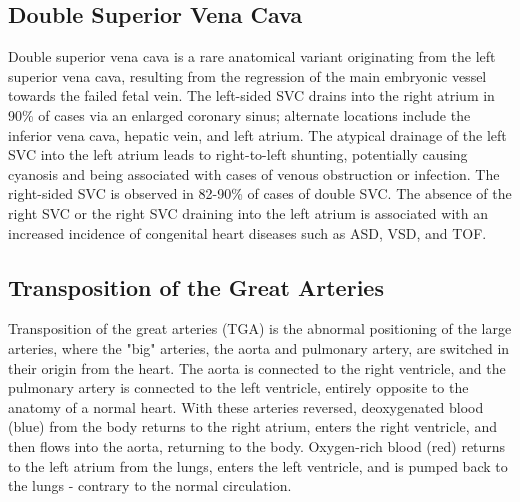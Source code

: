 \documentclass{article}
\begin{document}
\subsection{Double Superior Vena Cava}
Double superior vena cava is a rare anatomical variant originating from the left superior vena cava, resulting from the regression of the main embryonic vessel towards the failed fetal vein. The left-sided SVC drains into the right atrium in 90\% of cases via an enlarged coronary sinus; alternate locations include the inferior vena cava, hepatic vein, and left atrium. The atypical drainage of the left SVC into the left atrium leads to right-to-left shunting, potentially causing cyanosis and being associated with cases of venous obstruction or infection. The right-sided SVC is observed in 82-90\% of cases of double SVC. The absence of the right SVC or the right SVC draining into the left atrium is associated with an increased incidence of congenital heart diseases such as ASD, VSD, and TOF.

\subsection{Transposition of the Great Arteries}
Transposition of the great arteries (TGA) is the abnormal positioning of the large arteries, where the "big" arteries, the aorta and pulmonary artery, are switched in their origin from the heart. The aorta is connected to the right ventricle, and the pulmonary artery is connected to the left ventricle, entirely opposite to the anatomy of a normal heart. With these arteries reversed, deoxygenated blood (blue) from the body returns to the right atrium, enters the right ventricle, and then flows into the aorta, returning to the body. Oxygen-rich blood (red) returns to the left atrium from the lungs, enters the left ventricle, and is pumped back to the lungs - contrary to the normal circulation.
\end{document}

